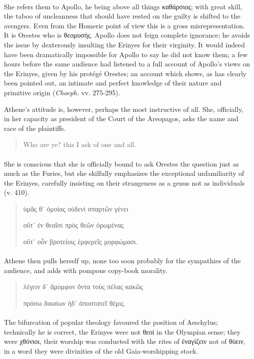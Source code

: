 \documentclass[a4paper, 11pt, oneside, polutonikogreek, english]{article}
\begin{document}
\paragraph{}
She refers them to Apollo, he being above all things καθάρσιος; with great skill, the taboo of uncleanness that should have rested on the guilty is shifted to the avengers. Even from the Homeric point of view this is a gross misrepresentation. It is Orestes who is θεομυσής. Apollo does not feign complete ignorance; he avoids the issue by dexterously insulting the Erinyes for their virginity. It would indeed have been dramatically impossible for Apollo to say he did not know them; a few hours before the same audience had listened to a full account of Apollo's views on the Erinyes, given by his protégé Orestes; an account which shows, as has clearly been pointed out, an intimate and perfect knowledge of their nature and primitive origin (\emph{Choeph.} vv. 275-295).

Athene's attitude is, however, perhaps the most instructive of all. She, officially, in her capacity as president of the Court of the Areopagos, asks the name and race of the plaintiffs.
\begin{quotation}
Who are ye? this I ask of one and all.
\end{quotation}
\paragraph{}
She is conscious that she is officially bound to ask Orestes the question just as much as the Furies, but she skilfully emphasizes the exceptional unfamiliarity of the Erinyes, carefully insisting on their strangeness as a genus not as individuals (v. 410).
\begin{quotation}
ὑμᾶς θ᾽ ὁμοίας οὐδενὶ σπαρτῶν γένει

οὔτ᾽ ἐν θεαῖσι πρὸς θεῶν ὁρωμένας

οὔτ᾽ οὖν βροτείοις ἐμφερεῖς μορφώμασι.
\end{quotation}
\paragraph{}
Athene then pulls herself up, none too soon probably for the sympathies of the audience, and adds with pompous copy-book morality.
\begin{quotation}
λέγειν δ᾽ ἄμομφον ὄντα τοὺς πέλας κακῶς

πρόσω δικαίων ἠδ᾽ ἀποστατεῖ θέμις.
\end{quotation}
\paragraph{}
The bifurcation of popular theology favoured the position of Aeschylus; technically he is correct, the Erinyes were not θεοί in the Olympian sense; they were χθόνιοι, their worship was conducted with the rites of ἐναγίζειν not of θύειν, in a word they were divinities of the old Gaia-worshipping stock.
\end{document}
